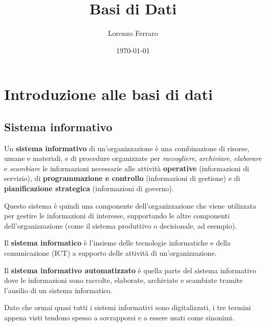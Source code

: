 \documentclass[11pt, a4paper, titlepage, oneside]{scrbook}
\title{Basi di Dati}
\author{Lorenzo Ferraro}
\date{\today}
\begin{document}
\frontmatter
\SapienzaCoverItalianoTriennale
\InfoSegnalazioni

\tableofcontents

\mainmatter

\chapter{Introduzione alle basi di dati}

\section{Sistema informativo}

\begin{Definizione}
\label{def-sistema-informativo}
Un \textbf{sistema informativo} di un'organizzazione è una combinazione di risorse, umane e materiali, e di procedure organizzate per \textit{raccogliere}, \textit{archiviare}, \textit{elaborare} e \textit{scambiare} le informazioni necessarie alle attività \textbf{operative} (informazioni di servizio), di \textbf{programmazione e controllo} (informazioni di gestione) e di \textbf{pianificazione strategica} (informazioni di governo).
\end{Definizione}

Questo sistema è quindi una componente dell'organizzazione che viene utilizzata per gestire le informazioni di interesse, supportando  le altre componenti dell'organizzazione (come il sistema produttivo o decisionale, ad esempio). 

\begin{Definizione}
\label{def-sistema-informatico}
Il \textbf{sistema informatico} è l'insieme delle tecnologie informatiche e della comunicazione (ICT) a supporto delle attività di un'organizzazione.
\end{Definizione}

\begin{Definizione}
\label{def-sistema-informativo-automatizzato}
Il \textbf{sistema informativo automatizzato} è quella parte del sistema informativo dove le informazioni sono raccolte, elaborate, archiviate e scambiate tramite l'ausilio di un sistema informatico.
\end{Definizione}

Dato che ormai quasi tutti i sistemi informativi sono digitalizzati, i tre termini appena visti tendono spesso a sovrapporsi e a essere usati come sinonimi.
\end{document}
